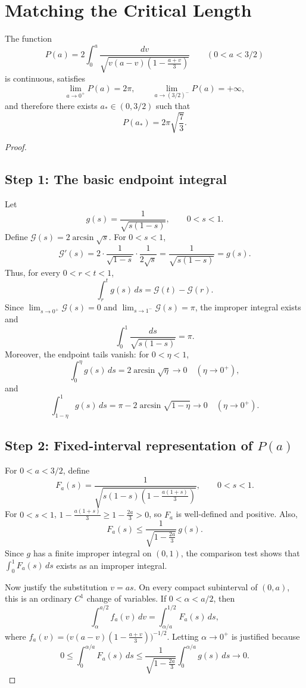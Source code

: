 \section{Matching the Critical Length}

\begin{proposition}\label{prop:matching}
The function
\[
P(a) = 2\int_0^a \frac{dv}{\sqrt{v(a-v)\!\left(1 - \frac{a+v}{3}\right)}} \qquad (0 < a < 3/2)
\]
is continuous, satisfies
\[
\lim_{a \to 0^+} P(a) = 2\pi, \qquad \lim_{a \to (3/2)^-} P(a) = +\infty,
\]
and therefore there exists $a_* \in (0, 3/2)$ such that
\[
P(a_*) = 2\pi\sqrt{\frac{7}{3}}.
\]
\end{proposition}

\begin{proof}

\subsection*{Step 1: The basic endpoint integral}

Let
\[
g(s) = \frac{1}{\sqrt{s(1-s)}}, \qquad 0 < s < 1.
\]
Define $\mathcal{G}(s) = 2\arcsin\sqrt{s}$. For $0 < s < 1$,
\[
\mathcal{G}'(s) = 2 \cdot \frac{1}{\sqrt{1-s}} \cdot \frac{1}{2\sqrt{s}} = \frac{1}{\sqrt{s(1-s)}} = g(s).
\]
Thus, for every $0 < r < t < 1$,
\[
\int_r^t g(s)\,ds = \mathcal{G}(t) - \mathcal{G}(r).
\]
Since $\lim_{s \to 0^+} \mathcal{G}(s) = 0$ and $\lim_{s \to 1^-} \mathcal{G}(s) = \pi$, the improper integral exists and
\[
\int_0^1 \frac{ds}{\sqrt{s(1-s)}} = \pi.
\]
Moreover, the endpoint tails vanish: for $0 < \eta < 1$,
\[
\int_0^\eta g(s)\,ds = 2\arcsin\sqrt{\eta} \to 0 \quad (\eta \to 0^+),
\]
and
\[
\int_{1-\eta}^1 g(s)\,ds = \pi - 2\arcsin\sqrt{1-\eta} \to 0 \quad (\eta \to 0^+).
\]

\subsection*{Step 2: Fixed-interval representation of $P(a)$}

For $0 < a < 3/2$, define
\[
F_a(s) = \frac{1}{\sqrt{s(1-s)\!\left(1 - \frac{a(1+s)}{3}\right)}}, \qquad 0 < s < 1.
\]
For $0 < s < 1$, $1 - \frac{a(1+s)}{3} \ge 1 - \frac{2a}{3} > 0$, so $F_a$ is well-defined and positive. Also,
\[
F_a(s) \le \frac{1}{\sqrt{1 - \frac{2a}{3}}}\,g(s).
\]
Since $g$ has a finite improper integral on $(0,1)$, the comparison test shows that $\int_0^1 F_a(s)\,ds$ exists as an improper integral.

Now justify the substitution $v = as$. On every compact subinterval of $(0,a)$, this is an ordinary $C^1$ change of variables. If $0 < \alpha < a/2$, then
\[
\int_\alpha^{a/2} f_a(v)\,dv = \int_{\alpha/a}^{1/2} F_a(s)\,ds,
\]
where $f_a(v) = \bigl(v(a-v)(1 - \frac{a+v}{3})\bigr)^{-1/2}$. Letting $\alpha \to 0^+$ is justified because
\[
0 \le \int_0^{\alpha/a} F_a(s)\,ds \le \frac{1}{\sqrt{1 - \frac{2a}{3}}} \int_0^{\alpha/a} g(s)\,ds \longrightarrow 0.
\]


\end{proof}
